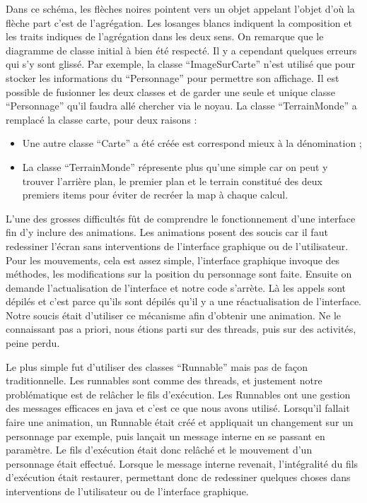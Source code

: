 \documentclass{report}
\begin{document}
Dans ce schéma, les flèches noires pointent vers un objet appelant l’objet d’où la flèche part c’est de l'agrégation. Les losanges blancs indiquent la composition et les traits indiques de l’agrégation dans les deux sens. 
On remarque que le diagramme de classe initial à bien été respecté. Il y a cependant quelques erreurs qui s’y sont glissé. Par exemple, la classe “ImageSurCarte” n’est utilisé que pour stocker les informations du “Personnage” pour permettre son affichage. Il est possible de fusionner les deux classes et de garder une seule et unique classe “Personnage” qu’il faudra allé chercher via le noyau.
La classe “TerrainMonde” a remplacé la classe carte, pour deux raisons :
\begin{itemize}
\item Une autre classe “Carte” a été créée est correspond mieux à la dénomination ;
\item La classe “TerrainMonde” répresente plus qu’une simple car on peut y trouver l’arrière plan, le premier plan et le terrain constitué des deux premiers items pour éviter de recréer la map à chaque calcul.
\end{itemize}
L’une des grosses difficultés fût de comprendre le fonctionnement d’une interface fin d’y inclure des animations. Les animations posent des soucis car il faut redessiner l’écran sans interventions de l’interface graphique ou de l’utilisateur. Pour les mouvements, cela est assez simple, l’interface graphique invoque des méthodes, les modifications sur la position du personnage sont faite. Ensuite on demande l’actualisation de l’interface et notre code s’arrète. Là les appels sont dépilés et c’est parce qu’ils sont dépilés qu’il y a une réactualisation de l’interface. Notre soucis était d’utiliser ce mécanisme afin d’obtenir une animation. Ne le connaissant pas a priori, nous étions parti sur des threads, puis sur des activités, peine perdu.

Le plus simple fut d’utiliser des classes “Runnable” mais pas de façon traditionnelle. Les runnables sont comme des threads, et justement notre problématique est de relâcher le fils d'exécution. Les Runnables ont une gestion des messages efficaces en java et c’est ce que nous avons utilisé. Lorsqu’il fallait faire une animation, un Runnable était créé et appliquait un changement sur un personnage par exemple, puis lançait un message interne en se passant en paramètre. Le fils d'exécution était donc relâché et le mouvement d’un personnage était effectué.
Lorsque le message interne revenait, l’intégralité du fils d'exécution était restaurer, permettant donc de redessiner quelques choses dans interventions de l’utilisateur ou de l’interface graphique.
\end{document}
